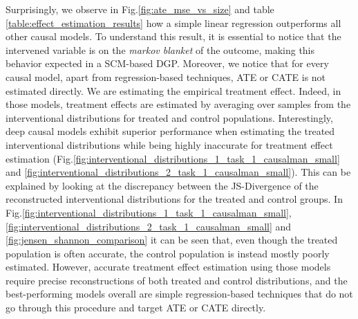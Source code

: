 Surprisingly, we observe in Fig.\ref{fig:ate_mse_vs_size} and table \ref{table:effect_estimation_results} how a simple linear regression outperforms all other causal models. To understand this result, it is essential to notice that the intervened variable is on the \textit{markov blanket} of the outcome, making this behavior expected in a SCM-based DGP. Moreover, we notice that for every causal model, apart from regression-based techniques, ATE or CATE is not estimated directly. We are estimating the empirical treatment effect.
Indeed, in those models, treatment effects are estimated by averaging over samples from the interventional distributions for treated and control populations. Interestingly, deep causal models exhibit superior performance when estimating the treated interventional distributions while being highly inaccurate for treatment effect estimation (Fig.\ref{fig:interventional_distributions_1_task_1_causalman_small} and \ref{fig:interventional_distributions_2_task_1_causalman_small}). 
This can be explained by looking at the discrepancy between the JS-Divergence of the reconstructed interventional distributions for the treated and control groups. In Fig.\ref{fig:interventional_distributions_1_task_1_causalman_small}, \ref{fig:interventional_distributions_2_task_1_causalman_small} and \ref{fig:jensen_shannon_comparison} it can be seen that, even though the treated population is often accurate, the control population is instead mostly poorly estimated. However, accurate treatment effect estimation using those models require precise reconstructions of both treated and control distributions, and the best-performing models overall are simple regression-based techniques that do not go through this procedure and target ATE or CATE directly.

